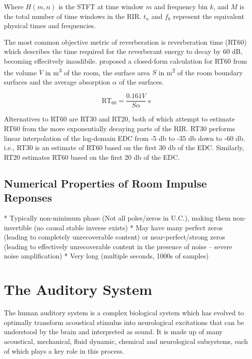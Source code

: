 Where $H(m,n)$ is the STFT at time window $m$ and frequency bin $k$, and $M$ is the total number of time windows in the RIR. $t_n$ and $f_k$ represent the equivalent physical times and frequencies.

The most common objective metric of reverberation is reverberation time (RT60) which describes the time required for the reverberant energy to decay by 60 dB, becoming effecitvely inaudibile. \cite{sabine1922collected} proposed a closed-form calculation for RT60 from the volume $V$ in \unit{\metre\cubed} of the room, the surface area $S$ in \unit{\metre\squared} of the room boundary surfaces and the average absorption $\alpha$ of the surfaces.

\[\mathrm{RT}_{60}=\frac{0.161V}{S\alpha}\;\unit{\second}\]

Alternatives to RT60 are RT30 and RT20, both of which attempt to estimate RT60 from the more exponentially decaying parts of the RIR. RT30 performs linear interpolation of the log-domain EDC from -5 \unit{\decibel} to -35 \unit{\decibel} down to -60 \unit{\decibel}. i.e., RT30 is an estimate of RT60 based on the first 30 \unit{\decibel} of the EDC. Similarly, RT20 estimates RT60 based on the first 20 \unit{\decibel} of the EDC. 

\subsection{Numerical Properties of Room Impulse Reponses}

* Typically non-minimum phase (Not all poles/zeros in U.C.), making them non-invertible (no causal stable inverse exists)
* May have many perfect zeros (leading to completely unrecoverable content) or near-perfect/strong zeros (leading to effectively unrecoverable content in the presence of noise -- severe noise amplification)
* Very long (multiple seconds, 1000s of samples)


\section{The Auditory System}

The human auditory system is a complex biological system which has evolved to optimally transform acoustical stimulus into neurological excitations that can be understood by the brain and interpreted as sound. It is made up of many acoustical, mechanical, fluid dynamic, chemical and neurological subsystems, each of which plays a key role in this process.

